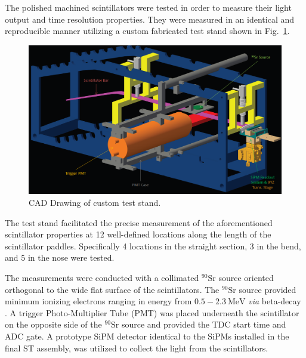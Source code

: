 The polished machined scintillators were tested in order to measure their light output and time resolution properties.  They were measured in an identical and reproducible manner utilizing a custom fabricated test stand shown in Fig.~\ref{fig:test_stand_model}. 
\begin{figure}[!htb]
	\centering
	\includegraphics[width=1.0\columnwidth]{fabrication/figs/test_stand_model}
	\caption[CAD Drawing of custom test stand]{CAD Drawing of custom test stand.}
	\label{fig:test_stand_model}
\end{figure}
The test stand facilitated the precise measurement of the aforementioned scintillator properties at 12 well-defined locations along the length of the scintillator paddles.  Specifically 4 locations in the straight section, 3 in the bend, and 5 in the nose were tested.  

The measurements were conducted with a collimated $\mathrm{^{90}Sr}$ source oriented orthogonal to the wide flat surface of the scintillators.  The $\mathrm{^{90}Sr}$ source provided minimum ionizing electrons ranging in energy from $\mathrm{0.5-2.3~MeV}$ \textit{via} beta-decay \cite{nndc_sr90}\cite{nndc_y90}.  A trigger Photo-Multiplier Tube (PMT) was placed underneath the scintillator on the opposite side of the $\mathrm{^{90}Sr}$ source and provided the TDC start time and ADC gate.  A prototype SiPM detector identical to the SiPMs installed in the final ST assembly, was utilized to collect the light from the scintillators.  

